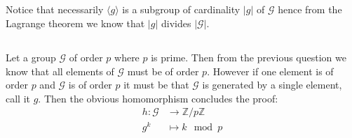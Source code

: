\documentclass[10pt,a4paper]{book}
\begin{document}
\subsection{}
Notice that necessarily $\langle g \rangle$ is a subgroup of cardinality $|g|$ of $\mathcal{G}$ hence from the Lagrange theorem we know that $|g|$ divides $|\mathcal{G}|$.

\subsection{}
Let a group $\mathcal{G}$ of order $p$ where $p$ is prime. Then from the previous question we know that all elements of $\mathcal{G}$ must be of order $p$. However if one element is of order $p$ and $\mathcal{G}$ is of order $p$ it must be that $\mathcal{G}$ is generated by a single element, call it $g$. Then the obvious homomorphism concludes the proof:
\begin{align*}
h : \mathcal{G} &\to \mathbb{Z}/p\mathbb{Z}\\
g^k &\mapsto k \mod p
\end{align*}
\end{document}
